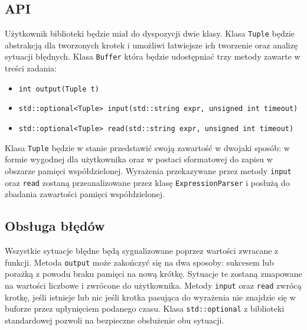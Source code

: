 \documentclass{article}
\begin{document}
	\subsection{API}
	Użytkownik biblioteki będzie miał do dyspozycji dwie klasy. Klasa \texttt{Tuple} będzie abstrakcją dla tworzonych krotek i umożliwi łatwiejsze ich tworzenie oraz analizę sytuacji błędnych. Klasa \texttt{Buffer} która będzie udostępniać trzy metody zawarte w treści zadania:
	\begin{itemize}
		\item \texttt{int output(Tuple t) }
		\item \texttt{std::optional<Tuple> input(std::string expr, unsigned int timeout)}
		\item \texttt{std::optional<Tuple> read(std::string expr, unsigned int timeout)}
	\end{itemize}
	Klasa \texttt{Tuple} będzie w stanie przedstawić swoją zawartość w dwojaki sposób: w formie wygodnej dla użytkownika oraz w postaci sformatowej do zapisu w obszarze pamięci współdzielonej.
	Wyrażenia przekazywane przez metody \texttt{input} oraz \texttt{read} zostaną przeanalizowane przez klasę \texttt{ExpressionParser} i posłużą do zbadania zawartości pamięci współdzielonej.

	\subsection{Obsługa błędów}
	Wszystkie sytuacje błędne będą sygnalizowane poprzez wartości zwracane z funkcji.
	Metoda \texttt{output} może zakończyć się na dwa sposoby: sukcesem lub porażką z powodu braku pamięci na nową krótkę. Sytuacje te zostaną zmapowane na wartości liczbowe i zwrócone do użytkownika.
	Metody \texttt{input} oraz \texttt{read} zwrócą krotkę, jeśli istnieje lub nic jeśli krotka pasująca do wyrażenia nie znajdzie się w buforze przez upłynięciem podanego czasu. Klasa \texttt{std::optional} z biblioteki standardowej pozwoli na bezpieczne obsłużenie obu sytuacji.
\end{document}
